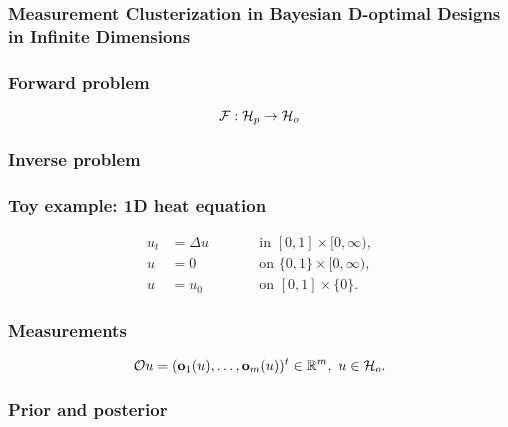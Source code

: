 \documentclass{beamer}
\begin{document}
\begin{frame}
\frametitle{Measurement Clusterization in Bayesian D-optimal Designs in Infinite Dimensions}
\end{frame}

\begin{frame}
\frametitle{Forward problem}
\[
\mathcal{F}: \mathcal{H}_p \to \mathcal{H}_o
\]
\end{frame}

\begin{frame}
\frametitle{Inverse problem}
\end{frame}

\begin{frame}
\frametitle{Toy example: 1D heat equation}

\begin{subequations}\label{eq:heat equation}
  \begin{alignat}{2}
    u_t &= \Delta u &&\qquad \text{in } [0,1] \times [0,\infty),\\
      u &= 0 &&\qquad \text{on } \{0, 1\} \times [0,\infty),\\
        u &= u_0 &&\qquad \text{on }[0,1] \times \{0\}.
  \end{alignat}
\end{subequations}

\end{frame}

\begin{frame}
\frametitle{Measurements}
\begin{equation*}%
  \obs u = (\meas_1(u), \dots, \meas_m(u) )^t \in \R^m,\ u \in \hilo.
\end{equation*}

\end{frame}

\begin{frame}
\frametitle{Prior and posterior}
\end{frame}
\end{document}
